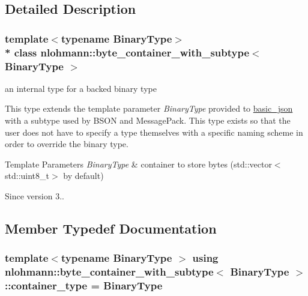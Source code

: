\subsection{Detailed Description}
\subsubsection*{template$<$typename Binary\+Type$>$\\*
class nlohmann\+::byte\+\_\+container\+\_\+with\+\_\+subtype$<$ Binary\+Type $>$}

an internal type for a backed binary type 

This type extends the template parameter {\itshape Binary\+Type} provided to {\ttfamily \hyperlink{classnlohmann_1_1basic__json}{basic\+\_\+json}} with a subtype used by B\+S\+ON and Message\+Pack. This type exists so that the user does not have to specify a type themselves with a specific naming scheme in order to override the binary type.


\begin{DoxyTemplParams}{Template Parameters}
{\em Binary\+Type} & container to store bytes ({\ttfamily std\+::vector$<$std\+::uint8\+\_\+t$>$} by default)\\
\hline
\end{DoxyTemplParams}
\begin{DoxySince}{Since}
version 3.. 
\end{DoxySince}


\subsection{Member Typedef Documentation}
\subsubsection[{\texorpdfstring{container\+\_\+type}{container_type}}]{\setlength{\rightskip}{0pt plus 5cm}template$<$typename Binary\+Type $>$ using {\bf nlohmann\+::byte\+\_\+container\+\_\+with\+\_\+subtype}$<$ Binary\+Type $>$\+::{\bf container\+\_\+type} =  Binary\+Type}\hypertarget{classnlohmann_1_1byte__container__with__subtype_a4d27e8633c5a5e3b49dd4ccb06515713}{}\label{classnlohmann_1_1byte__container__with__subtype_a4d27e8633c5a5e3b49dd4ccb06515713}


